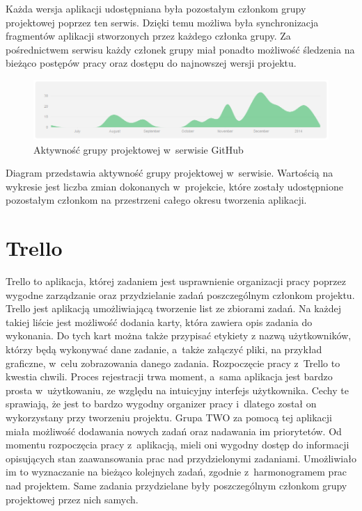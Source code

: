 Każda wersja aplikacji udostępniana była pozostałym członkom grupy projektowej poprzez ten serwis. Dzięki temu możliwa była synchronizacja fragmentów aplikacji stworzonych przez każdego członka grupy. Za pośrednictwem serwisu każdy członek grupy miał ponadto możliwość śledzenia na bieżąco postępów pracy oraz dostępu do najnowszej wersji projektu. 
\begin{figure}[h]
	\centering
	\includegraphics[width=1.00\textwidth]{images/git.png}
	\caption{Aktywność grupy projektowej w~serwisie GitHub}
\end{figure}

Diagram przedstawia aktywność grupy projektowej w~serwisie. Wartością na wykresie jest liczba zmian dokonanych w~projekcie, które zostały udostępnione pozostałym członkom na przestrzeni całego okresu tworzenia aplikacji. 

\section{Trello}
Trello to aplikacja, której zadaniem jest usprawnienie organizacji pracy poprzez wygodne zarządzanie oraz przydzielanie zadań poszczególnym członkom projektu. Trello jest aplikacją umożliwiającą tworzenie list ze zbiorami zadań. Na każdej takiej liście jest możliwość dodania karty, która zawiera opis zadania do wykonania. Do tych kart można także przypisać etykiety z nazwą użytkowników, którzy będą wykonywać dane zadanie, a~także załączyć pliki,  na przykład graficzne, w~celu zobrazowania danego zadania. Rozpoczęcie pracy z~Trello  to kwestia chwili. Proces rejestracji trwa moment, a~sama aplikacja jest bardzo prosta w~użytkowaniu, ze względu na intuicyjny interfejs użytkownika. Cechy te sprawiają, że jest to bardzo wygodny organizer pracy i~dlatego został on wykorzystany przy tworzeniu projektu. Grupa TWO za pomocą tej aplikacji miała możliwość dodawania nowych zadań oraz nadawania im priorytetów. Od momentu rozpoczęcia pracy z~aplikacją, mieli oni wygodny dostęp do informacji opisujących stan zaawansowania prac nad przydzielonymi zadaniami. Umożliwiało im to wyznaczanie na bieżąco kolejnych zadań, zgodnie z~harmonogramem prac nad projektem. Same zadania przydzielane były poszczególnym członkom grupy projektowej przez nich samych. 


